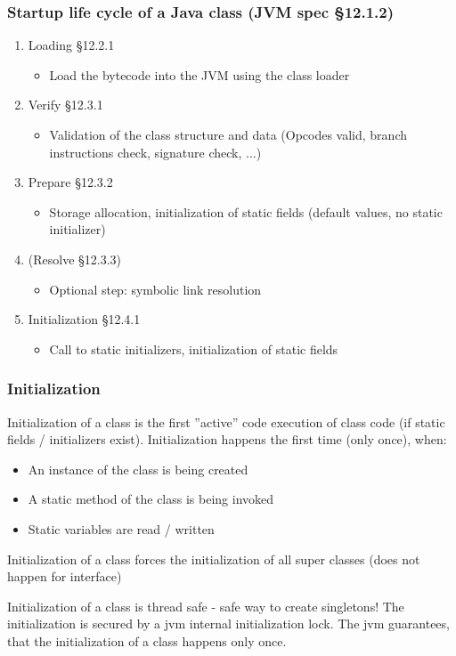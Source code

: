 \documentclass[aspectratio=169]{beamer}
\begin{document}
\begin{frame}
	\frametitle{Startup life cycle of a Java class (JVM spec §12.1.2)}
	\begin{enumerate}
		\item{Loading §12.2.1}
			\begin{itemize}
				\item{Load the bytecode into the JVM using the class loader}
			\end{itemize}
		\item{Verify §12.3.1}
			\begin{itemize}
				\item{Validation of the class structure and data (Opcodes valid, branch instructions check, signature check, ...)}
			\end{itemize}
		\item{Prepare §12.3.2}
			\begin{itemize}
				\item{Storage allocation, initialization of static fields (default values, no static initializer)}
			\end{itemize}
		\item{(Resolve §12.3.3)}
			\begin{itemize}
				\item{Optional step: symbolic link resolution}
			\end{itemize}
		\item{Initialization §12.4.1}
			\begin{itemize}
				\item{Call to static initializers, initialization of static fields}
			\end{itemize}
	\end{enumerate}
\end{frame}

\begin{frame}
	\frametitle{Initialization}
	Initialization of a class is the first ''active'' code execution of class code (if static fields / initializers exist). Initialization happens the first time (only once), when:
	\begin{itemize}
		\item{An instance of the class is being created}
		\item{A static method of the class is being invoked}
		\item{Static variables are read / written}
	\end{itemize}

	Initialization of a class forces the initialization of all super classes (does not happen for interface) %
	\begin{block}{Initialization of a class is thread safe - safe way to create singletons!}
		The initialization is secured by a jvm internal initialization lock. The jvm guarantees, that the initialization of a class happens only once.
	\end{block}
\end{frame}
\end{document}
